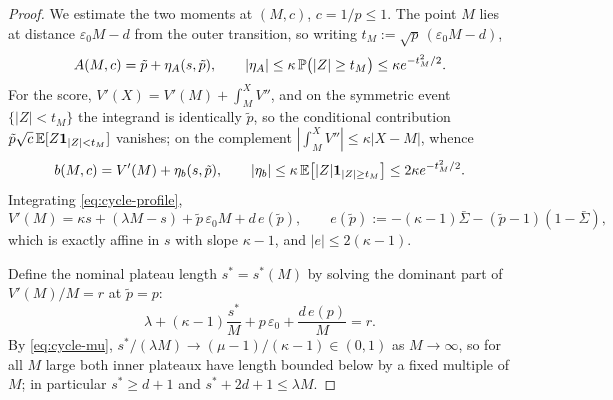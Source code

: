 \begin{proof}
    We estimate the two moments at $(M,c)$, $c=1/p\leq1$. The point $M$ lies at distance
    $\varepsilon_0M-d$ from the outer transition, so writing
    $t_M:=\sqrt p\,(\varepsilon_0M-d)$,
    \begin{equation}\label{eq:cycle-A-est}
        A(M,c)=\tilde p+\eta_A(s,\tilde p),
        \qquad
        |\eta_A|\leq\kappa\,\mathbb{P}\bigl(|Z|\geq t_M\bigr)\leq\kappa e^{-t_M^2/2}.
    \end{equation}
    For the score, $V'(X)=V'(M)+\int_M^XV''$, and on the symmetric event
    $\{|Z|<t_M\}$ the integrand is identically $\tilde p$, so the conditional contribution
    $\tilde p\sqrt c\,\mathbb{E}[Z\mathbf{1}_{|Z|<t_M}]$ vanishes; on the complement
    $|{\int_M^XV''}|\leq\kappa|X-M|$, whence
    \begin{equation}\label{eq:cycle-b-est}
        b(M,c)=V'(M)+\eta_b(s,\tilde p),
        \qquad
        |\eta_b|\leq\kappa\,\mathbb{E}\bigl[|Z|\mathbf{1}_{|Z|\geq t_M}\bigr]\leq2\kappa e^{-t_M^2/2}.
    \end{equation}
    Integrating \eqref{eq:cycle-profile},
    \begin{equation}\label{eq:cycle-VprimeM}
        V'(M)=\kappa s+(\lambda M-s)+\tilde p\,\varepsilon_0M+d\,e(\tilde p),
        \qquad
        e(\tilde p):=-(\kappa-1)\bar\Sigma-(\tilde p-1)(1-\bar\Sigma),
    \end{equation}
    which is exactly affine in $s$ with slope $\kappa-1$, and $|e|\leq2(\kappa-1)$.

    Define the nominal plateau length $s^*=s^*(M)$ by solving the dominant part of
    $V'(M)/M=r$ at $\tilde p=p$:
    \begin{equation}\label{eq:cycle-sstar}
        \lambda+(\kappa-1)\frac{s^*}M+p\,\varepsilon_0+\frac{d\,e(p)}M=r .
    \end{equation}
    By \eqref{eq:cycle-mu}, $s^*/(\lambda M)\to(\mu-1)/(\kappa-1)\in(0,1)$ as $M\to\infty$,
    so for all $M$ large both inner plateaux have length bounded below by a fixed multiple of
    $M$; in particular $s^*\geq d+1$ and $s^*+2d+1\leq\lambda M$.


\end{proof}
